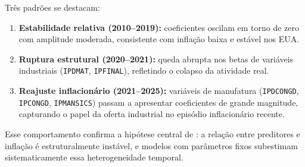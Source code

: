 \documentclass[12pt, a4paper]{article}
\begin{document}
Três padrões se destacam:

\begin{enumerate}
  \item \textbf{Estabilidade relativa (2010--2019):} coeficientes
    oscilam em torno de zero com amplitude moderada, consistente
    com inflação baixa e estável nos EUA.
  \item \textbf{Ruptura estrutural (2020--2021):} queda abrupta
    nos betas de variáveis industriais (\texttt{IPDMAT},
    \texttt{IPFINAL}), refletindo o colapso da atividade real.
  \item \textbf{Reajuste inflacionário (2021--2025):} variáveis de
    manufatura (\texttt{IPDCONGD}, \texttt{IPCONGD},
    \texttt{IPMANSICS}) passam a apresentar coeficientes de grande
    magnitude, capturando o papel da oferta industrial no episódio
    inflacionário recente.
\end{enumerate}

Esse comportamento confirma a hipótese central de
\citet{Coulombe2021}: a relação entre preditores e inflação é
estruturalmente instável, e modelos com parâmetros fixos
subestimam sistematicamente essa heterogeneidade temporal.


\end{document}
